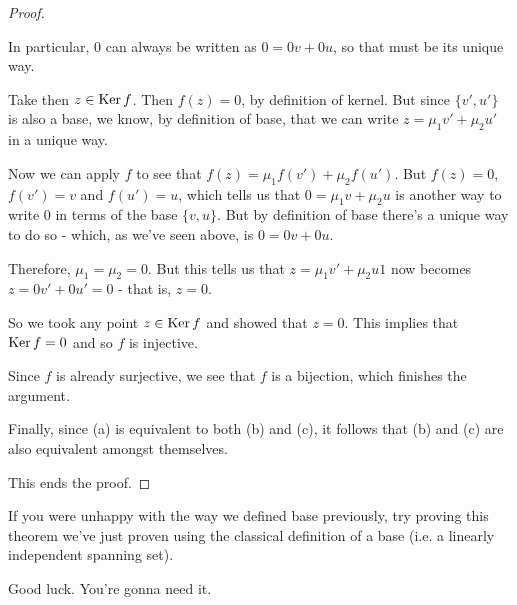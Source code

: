 \begin{proof}
\begin{itemize}
		In particular, $0$ can always be written as $0=0v+0u$, so that must be its unique way.
		
		Take then $z\in \operatorname{Ker} f$. Then $f(z)=0$, by definition of kernel. But since $\{v',u'\}$ is also a base, we know, by definition of base, that we can write $z=\mu_1v'+\mu_2u'$ in a unique way.
		
		Now we can apply $f$ to see that $f(z)=\mu_1f(v')+\mu_2f(u')$. But $f(z)=0$, $f(v')=v$ and $f(u')=u$, which tells us that $0=\mu_1v+\mu_2u$ is another way to write $0$ in terms of the base $\{v,u\}$. But by definition of base there's a unique way to do so - which, as we've seen above, is $0=0v+0u$.
		
		Therefore, $\mu_1=\mu_2=0$. But this tells us that $z=\mu_1v'+\mu_2u1$ now becomes $z=0v'+0u'=0$ - that is, $z=0$.
		
		So we took any point $z\in \operatorname{Ker} f$ and showed that $z=0$. This implies that $\operatorname{Ker} f=0$ and so $f$ is injective.
		
		Since $f$ is already surjective, we see that $f$ is a bijection, which finishes the argument.
	\end{itemize}

Finally, since (a) is equivalent to both (b) and (c), it follows that (b) and (c) are also equivalent amongst themselves.

This ends the proof.
\end{proof}
\begin{rmk}
	If you were unhappy with the way we defined base previously, try proving this theorem we've just proven using the classical definition of a base (i.e. a linearly independent spanning set).
	
	Good luck. You're gonna need it.
\end{rmk}

